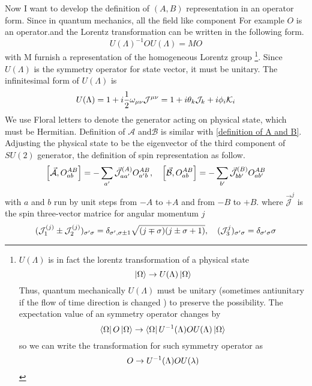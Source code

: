 Now I want to develop the definition of $(A,B)$ representation in an operator form. Since in quantum mechanics, all the field like component For example $O$ is an operator.and the Lorentz transformation can be written in the following form.
\begin{equation}
U(\Lambda)^{-1} O U(\Lambda) = M O
\end{equation}
with M furnish a representation of the homogeneous Lorentz group
\footnote{
	$U(\Lambda)$ is in fact the lorentz transformation of a physical state
	\begin{equation}
		\ket{\Omega} \rightarrow U(\Lambda) \ket{\Omega} \notag
    \end{equation}
	Thus, quantum mechanically $U(\Lambda)$ must be unitary (sometimes antiunitary if the flow of time direction is changed ) to preserve the possibility. 
	The expectation value of an symmetry operator changes by
	\begin{equation} 
	\bra{\Omega}O\ket{\Omega}\rightarrow \bra{\Omega} U^{-1}(\Lambda)O U(\Lambda)\ket{\Omega} \notag
	\end{equation}
	so we can write the transformation for such symmetry operator as
	\begin{equation}
	O \rightarrow  U^{-1}(\Lambda)O U(\lambda)\notag
	\end{equation}
}.
Since $U(\Lambda)$ is the symmetry operator for state vector, it must be unitary. The infinitesimal form of $U(\Lambda)$ is
\begin{equation} \label{infinitesimal form of ULa}
U(\Lambda) = 1 +  i\frac{1}{2} \omega_{\mu\nu} \mathcal{J}^{\mu\nu}
=1 +  i \theta_k \mathcal{J}_k + i \phi_i \mathcal{K}_i
\end{equation}
We use Floral letters to denote the generator acting on physical state, which must be Hermitian. Definition of $\mathcal{A}$ and$\mathcal{B}$ is similar with \eqref{definition of A and B}. 
Adjusting the physical state to be the eigenvector of the third component of $SU(2)$ generator, the definition of spin representation as follow.
\begin{equation} \label{the definition of spin representation}
\comm{\vec{\mathcal{A}}}{O_{ab}^{AB}} = -\sum_{a'}\vec{\mathcal{J}}^{(A)}_{aa'}O^{AB}_{a'b},\quad
\comm{\vec{\mathcal{B}}}{O_{ab}^{AB}} = -\sum_{b'}\vec{\mathcal{J}}^{(B)}_{bb'}O^{AB}_{ab'}
\end{equation}
with $a$ and $b$ run by unit steps from $-A$ to $+A$ and from $-B$ to $+B$. where $\vec{\mathcal{J}}^{j}$ is the spin three-vector  matrice for angular momentum $j$
\begin{equation} \label{three vector matrice for angular momentum}
(\mathcal{J}_1^{(j)}\pm \mathcal{J}_2^{(j)})_{\sigma'\sigma} = \delta_{\sigma',\sigma\pm 1}
\sqrt{(j\mp\sigma)(j\pm\sigma+1)},\quad
(\mathcal{J}_3^{j})_{\sigma'\sigma} = \delta_{\sigma'\sigma} \sigma
\end{equation}
